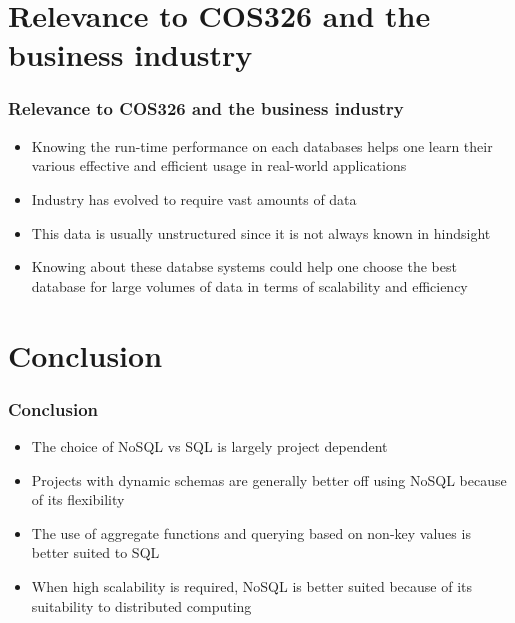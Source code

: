\documentclass{beamer}
\begin{document}
	\section{Relevance to COS326 and the business industry}
		\begin{frame}
		\frametitle{Relevance to COS326 and the business industry}
		 \begin{itemize}
		     \item  Knowing the run-time performance on each databases helps one learn their various effective and efficient usage in real-world applications
		     \item Industry has evolved to require vast amounts of data
		     \item This data is usually unstructured since it is not always known in hindsight
		     \item Knowing about these databse systems could help one choose the best database for large volumes of data in terms of scalability and efficiency
		 \end{itemize}
		\end{frame}
		
	\section{Conclusion}
			\begin{frame}
			\frametitle{Conclusion}
                \begin{itemize}
                    \item The choice of NoSQL vs SQL is largely project dependent
                    \item Projects with dynamic schemas are generally better off using NoSQL because of its flexibility
                    \item The use of aggregate functions and querying based on non-key values is better suited to SQL
                    \item When high scalability is required, NoSQL is better suited because of its suitability to distributed computing
                \end{itemize}
			\end{frame}
\end{document}
